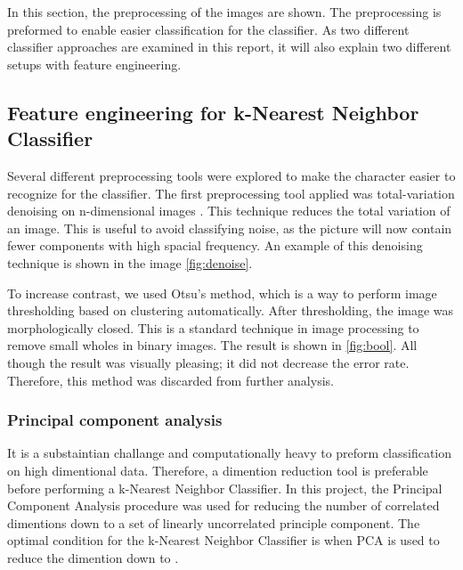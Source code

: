 \documentclass[../main.tex]{subfiles}
\begin{document}
In this section, the preprocessing of the images are shown. The preprocessing is preformed to enable easier classification for the classifier. As two different classifier approaches are examined in this report, it will also explain two different setups with feature engineering.

\subsection{Feature engineering for k-Nearest Neighbor Classifier}

Several different preprocessing tools were explored to make the character easier to recognize for the classifier. The first preprocessing tool applied was total-variation denoising on n-dimensional images \cite{dnoise_tv_chambolle}. This technique reduces the total variation of an image. This is useful to avoid classifying noise, as the picture will now contain fewer components with high spacial frequency. An example of this denoising technique is shown in the image \autoref{fig:denoise}.

To increase contrast, we used Otsu's method, which is a way to perform image thresholding based on clustering \cite{otsu} automatically. After thresholding, the image was morphologically closed. This is a standard technique in image processing to remove small wholes in binary images. The result is shown in \autoref{fig:bool}. All though the result was visually pleasing; it did not decrease the error rate. Therefore, this method was discarded from further analysis.

\subsubsection{Principal component analysis}

It is a substaintian challange and computationally heavy to preform classification on high dimentional data. Therefore, a dimention reduction tool is preferable before performing a k-Nearest Neighbor Classifier. In this project, the Principal Component Analysis procedure was used for reducing the number of correlated dimentions down to a set of linearly uncorrelated principle component. The optimal condition for the k-Nearest Neighbor Classifier is when PCA is used to reduce the dimention down to .
\end{document}
